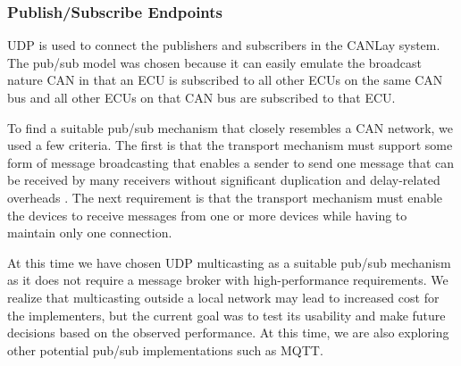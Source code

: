 \documentclass[letterpaper,twocolumn,10pt]{article}
\begin{document}

\subsubsection{Publish/Subscribe Endpoints}
UDP is used to connect the publishers and subscribers in the CANLay system. 
The pub/sub model was chosen because it can easily emulate the broadcast nature CAN \cite{kaiser_implementing_1999} in that an ECU is subscribed to all other ECUs on the same CAN bus and all other ECUs on that CAN bus are subscribed to that ECU. 

To find a suitable pub/sub mechanism that closely resembles a CAN network, we used a few criteria. The first is that the transport mechanism must support some form of message broadcasting that enables a sender to send one message that can be received by many receivers without significant duplication and delay-related overheads \cite{kaiser_implementing_1999}. The next requirement is that the transport mechanism must enable the devices to receive messages from one or more devices while having to maintain only one connection.

At this time we have chosen UDP multicasting as a suitable pub/sub mechanism as it does not require a message broker with high-performance requirements. We realize that multicasting outside a local network may lead to increased cost for the implementers, but the current goal was to test its usability and make future decisions based on the observed performance. At this time, we are also exploring other potential pub/sub implementations such as MQTT.
\end{document}
